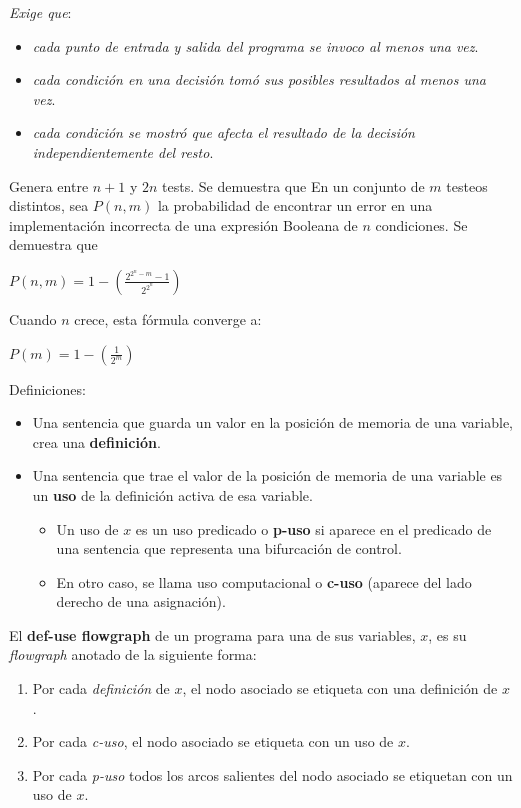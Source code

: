 \documentclass[]{article}
\begin{document}
\textit{Exige que}:
\begin{itemize}
	\item \textit{cada punto de entrada y salida del programa se invoco al menos una vez}.
	\item \textit{cada condición en una decisión tomó sus posibles resultados al menos una vez}.
	\item \textit{cada condición se mostró que afecta el resultado de la decisión independientemente del resto}.
\end{itemize}

Genera entre $n+1$ y $2n$ tests. Se demuestra que
En un conjunto de $m$ testeos distintos, sea $P(n,m)$ la probabilidad de encontrar un error en una implementación incorrecta de una expresión Booleana de $n$ condiciones. Se demuestra que
\begin{center}
	$\displaystyle P(n,m) = 1 - \left(\frac{2^{2^n-m}-1}{2^{2^n}}\right)$
\end{center}

Cuando $n$ crece, esta fórmula converge a:
\begin{center}
	$\displaystyle P(m) = 1-\left(\frac{1}{2^m}\right)$
\end{center}

Definiciones:
\begin{itemize}
	\item Una sentencia que guarda un valor en la posición de memoria de una variable, crea una \textbf{definición}.
	\item Una sentencia que trae el valor de la posición de memoria de una variable es un \textbf{uso} de la definición activa de esa variable.
	\begin{itemize}
		\item Un uso de $x$ es un uso predicado o \textbf{p-uso} si aparece en el predicado de una sentencia que representa una bifurcación de control.
		\item En otro caso, se llama uso computacional o \textbf{c-uso} (aparece del lado derecho de una asignación).
	\end{itemize}
\end{itemize}

El \textbf{def-use flowgraph} de un programa para una de sus variables, $x$, es su \textit{flowgraph} anotado de la siguiente forma: 
\begin{enumerate}
	\item Por cada \textit{definición} de $x$, el nodo asociado se etiqueta con una definición de $x$.
	\item Por cada \textit{c-uso}, el nodo asociado se etiqueta con un uso de $x$.
	\item Por cada \textit{p-uso} todos los arcos salientes del nodo asociado se etiquetan con un uso de $x$.
\end{enumerate}
\end{document}
